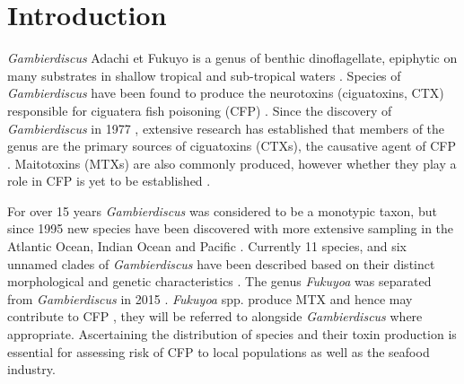 \documentclass[12pt]{article}
\begin{document}
\newpage

\section{Introduction}

\emph{Gambierdiscus} Adachi et Fukuyo is a genus of benthic dinoflagellate, epiphytic on many substrates in shallow tropical and sub-tropical waters \citep{marine2014}. Species of \emph{Gambierdiscus} have been found to produce the neurotoxins (ciguatoxins, CTX) responsible for ciguatera fish poisoning (CFP) \citep{berdalet2012global}. 
Since the discovery of \emph{Gambierdiscus} in 1977 \citep{yasumoto1977finding}, extensive research has established that members of the genus are the primary sources of ciguatoxins (CTXs), the causative agent of CFP \citep{chinain1997intraspecific,holmes1998gambierdiscus}. Maitotoxins (MTXs) are also commonly produced, however whether they play a role in CFP is yet to be established \citep{kohli2014feeding}. 

For over 15 years \emph{Gambierdiscus} was considered to be a monotypic taxon, but since 1995 new species have been discovered with more extensive sampling in the Atlantic Ocean, Indian Ocean and Pacific \citep{faust1995observation,holmes1998gambierdiscus,litaker2009taxonomy,chinain1999morphology,fraga2011gambierdiscus,nishimura2014morphology}.
Currently 11 species, and six unnamed clades of \emph{Gambierdiscus} have been described based on their distinct morphological and genetic characteristics \citep{adachi1979thecal,faust1995observation,chinain1999morphology,litaker2009taxonomy,nishimura2014morphology,fraga2011gambierdiscus}.  
The genus \emph{Fukuyoa} was separated from \emph{Gambierdiscus} in 2015 \citep{gomez2015fukuyoa}. \emph{Fukuyoa} spp. produce MTX \citep{holmes1998gambierdiscus,holland2013differences} and hence may contribute to CFP \citep{kohli2014feeding}, they will be referred to alongside \emph{Gambierdiscus} where appropriate.
Ascertaining the distribution of species and their toxin production is essential for assessing risk of CFP to local populations as well as the seafood industry.
\end{document}
